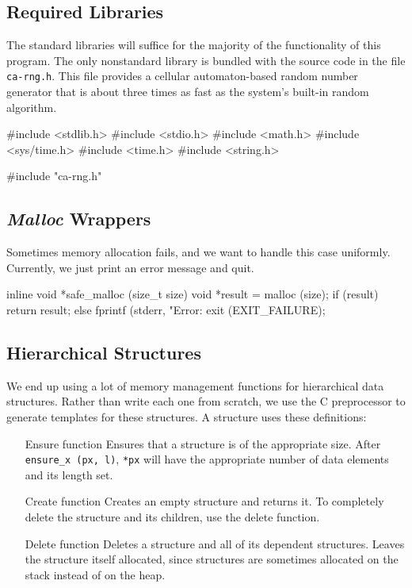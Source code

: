\documentclass{article}
\begin{document}
    \subsection{Required Libraries}
      \label{sec:libraries}

      The standard libraries will suffice for the majority of the functionality
      of this program. The only nonstandard library is bundled with the source
      code in the file \verb|ca-rng.h|. This file provides a cellular
      automaton-based random number generator that is about three times as fast
      as the system's built-in random algorithm.

\begin{ccode}
#include <stdlib.h>
#include <stdio.h>
#include <math.h>
#include <sys/time.h>
#include <time.h>
#include <string.h>

#include "ca-rng.h"
\end{ccode}

    \subsection{{\em Malloc} Wrappers}
      \label{sec:malloc}

      Sometimes memory allocation fails, and we want to handle this case
      uniformly. Currently, we just print an error message and quit.

\begin{ccode}
inline void *safe_malloc (size_t size) {
  void *result = malloc (size);
  if (result)
    return result;
  else {
    fprintf (stderr, "Error: %
    exit (EXIT_FAILURE);
  }
}
\end{ccode}

    \subsection{Hierarchical Structures}
      \label{sec:hierarchical}

      We end up using a lot of memory management functions for hierarchical data
      structures. Rather than write each one from scratch, we use the C
      preprocessor to generate templates for these structures. A structure uses
      these definitions:

      \begin{enumerate}
        \item[Ensure function]
        Ensures that a structure is of the appropriate size. After
        \verb|ensure_x (px, l)|, \verb|*px| will have the appropriate number of
        data elements and its length set.

        \item[Create function]
        Creates an empty structure and returns it. To completely delete the
        structure and its children, use the delete function.

        \item[Delete function]
        Deletes a structure and all of its dependent structures. Leaves the
        structure itself allocated, since structures are sometimes allocated on
        the stack instead of on the heap.
      \end{enumerate}
\end{document}
